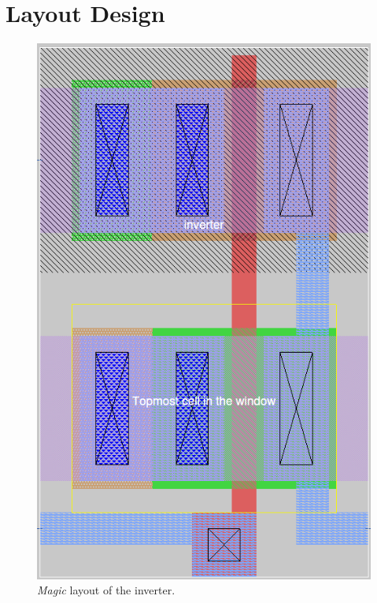 \documentclass[11pt]{article}
\begin{document}
\FloatBarrier
\section{Layout Design}
    \begin{figure}[!ht]
        \centering
        \includegraphics[width=0.8\linewidth]{inverter_mag.png}
        \caption{\textit{Magic} layout of the inverter.}
        \label{fig:invmag}
    \end{figure}
\end{document}
